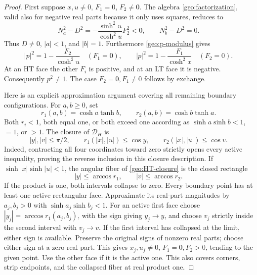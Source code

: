 \documentclass[11pt]{article}
\numberwithin{equation}{section}
\theoremstyle{definition}
\renewcommand{\DH}{\mathcal D_H}
\begin{document}
\begin{proof}
First suppose \(x,u\ne0\), \(F_1=0\), \(F_2\ne0\).
The algebra \eqref{geo:factorization}, valid also for
negative real parts because it only uses squares, reduces to
\begin{equation}\label{geo:strict-face}
 N_a^2-D^2=-\frac{\sinh^2u}{\cosh^2u}F_2^2<0,
 \qquad N_b^2-D^2=0.
\end{equation}
Thus \(D\ne0\), \(|a|<1\), and \(|b|=1\).
Furthermore \eqref{geo:p-modulus} gives
\begin{equation}\label{geo:p-edge}
 |p|^2=1-\frac{F_2}{\cosh^2u}\quad(F_1=0),\qquad
 |p|^2=1-\frac{F_1}{\cosh^2x}\quad(F_2=0).
\end{equation}
At an HT face the other \(F_i\) is positive, and at an LT
face it is negative.  Consequently \(p^2\ne1\).
The case \(F_2=0,F_1\ne0\) follows by exchange.

Here is an explicit approximation argument covering all
remaining boundary configurations.  For \(a,b\geq0\), set
\[
 r_1(a,b)=\cosh a\tanh b,\qquad
 r_2(a,b)=\cosh b\tanh a.
\]
Both \(r_i<1\), both equal one, or both exceed one
according as \(\sinh a\sinh b<1\), \(=1\), or \(>1\).
The closure of \(\DH\) is
\begin{equation}\label{geo:HT-closure}
 |y|,|v|\leq\pi/2,\qquad
 r_1(|x|,|u|)\leq\cos y,\qquad
 r_2(|x|,|u|)\leq\cos v.
\end{equation}
Indeed, contracting all four coordinates toward zero
strictly opens every active inequality, proving the
reverse inclusion in this closure description.
If \(\sinh|x|\sinh|u|<1\), the angular fiber of
\eqref{geo:HT-closure} is the closed rectangle
\[
 |y|\leq\arccos r_1,\qquad |v|\leq\arccos r_2.
\]
If the product is one, both intervals collapse to zero.
Every boundary point has at least one active rectangular
face.  Approximate its real-part magnitudes by
\(a_j,b_j>0\) with \(\sinh a_j\sinh b_j<1\).
For an active first face choose
\(|y_j|=\arccos r_1(a_j,b_j)\), with the sign giving
\(y_j\to y\), and choose \(v_j\) strictly inside the second
interval with \(v_j\to v\).  If the first interval has
collapsed at the limit, either sign is available.
Preserve the original signs of nonzero real parts; choose
either sign at a zero real part.  This gives \(x_j,u_j\ne0\),
\(F_1=0,F_2>0\), tending to the given point.
Use the other face if it is the active one.
This also covers corners, strip endpoints, and the collapsed
fiber at real product one.


\end{proof}
\end{document}
